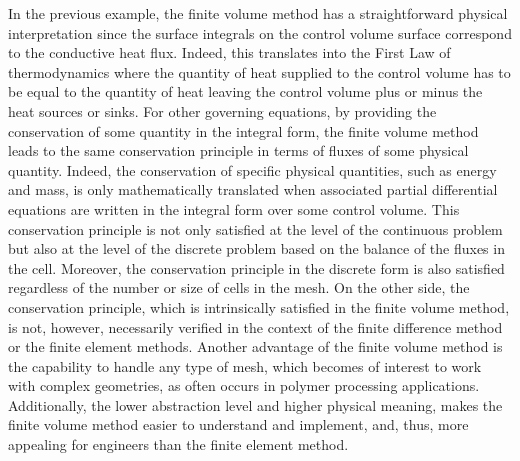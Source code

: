 In the previous example, the finite volume method has a straightforward physical interpretation since the surface integrals on the control volume surface correspond to the conductive heat flux.
Indeed, this translates into the First Law of thermodynamics where the quantity of heat supplied to the control volume has to be equal to the quantity of heat leaving the control volume plus or minus the heat sources or sinks.
For other governing equations, by providing the conservation of some quantity in the integral form, the finite volume method leads to the same conservation principle in terms of fluxes of some physical quantity.
Indeed, the conservation of specific physical quantities, such as energy and mass, is only mathematically translated when associated partial differential equations are written in the integral form over some control volume.
This conservation principle is not only satisfied at the level of the continuous problem but also at the level of the discrete problem based on the balance of the fluxes in the cell.
Moreover, the conservation principle in the discrete form is also satisfied regardless of the number or size of cells in the mesh.
On the other side, the conservation principle, which is intrinsically satisfied in the finite volume method, is not, however, necessarily verified in the context of the finite difference method or the finite element methods.
Another advantage of the finite volume method is the capability to handle any type of mesh, which becomes of interest to work with complex geometries, as often occurs in polymer processing applications.
Additionally, the lower abstraction level and higher physical meaning, makes the finite volume method easier to understand and implement, and, thus, more appealing for engineers than the finite element method.

